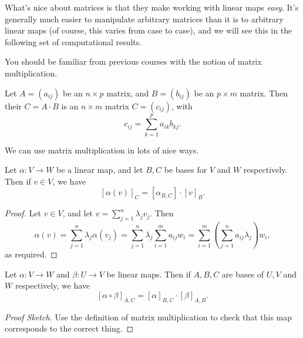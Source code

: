 \documentclass[a4paper]{scrartcl}
\begin{document}
What's nice about matrices is that they make working with linear maps \emph{easy}. It's generally much easier to manipulate arbitrary matrices than it is to arbitrary linear maps (of course, this varies from case to case), and we will see this in the following set of computational results.

You should be familiar from previous courses with the notion of matrix multiplication.

\begin{definition}
    Let $A = (a_{ij})$ be an $n \times p$ matrix, and $B = (b_{ij})$ 
    be an $p \times m$ matrix.
    Then their  $C = A\cdot B$ is an $n \times m$ matrix $C = (c_{ij})$, with
    $$
    c_{ij} = \sum_{k = 1}^p a_{ik}b_{kj}.
    $$
\end{definition}

We can use matrix multiplication in lots of nice ways.

\begin{lemma}
    Let $\alpha: V \rightarrow W$ be a linear map, and let $B, C$ be bases for $V$ and $W$ respectively. Then if $v \in V$, we have
    $$
    [\alpha(v)]_C = [\alpha_{B,C}] \cdot [v]_B.
    $$
\end{lemma}
\begin{proof}
    Let $v \in V$, and let $v = \sum_{j = 1}^n \lambda_j v_j$. Then
    $$
    \alpha(v) = \sum_{j = 1}^n \lambda_j \alpha(v_j) = \sum_{j = 1}^n \lambda_j \sum_{i = 1}^m a_{ij} w_i = \sum_{i = 1}^m \left(\sum_{j = 1}^n a_{ij} \lambda_j\right) w_i,
    $$
    as required.
\end{proof}

\begin{lemma}
    Let $\alpha: V \rightarrow W$ and $\beta: U \rightarrow V$ be linear maps. Then if $A, B, C$ are bases of $U, V$ and $W$ respectively, we have 
    $$
    [\alpha \circ \beta]_{A, C} = [\alpha]_{B, C} \cdot [\beta]_{A, B}.
    $$
\end{lemma}
\begin{proof}[Proof Sketch]
    Use the definition of matrix multiplication to check that this map corresponds to the correct thing.
\end{proof}


\end{document}
